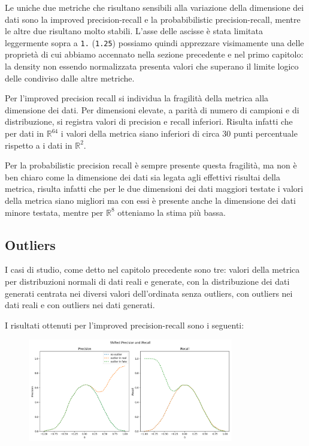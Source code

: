 Le uniche due metriche che risultano sensibili alla variazione della dimensione dei dati sono la improved precision-recall e la probabibilistic precision-recall, mentre le altre due risultano molto stabili.
L'asse delle ascisse è stata limitata leggermente sopra a \texttt{1.} (\texttt{1.25}) possiamo quindi apprezzare visimamente una delle proprietà di cui abbiamo accennato nella sezione precedente e nel primo capitolo:
la density non essendo normalizzata presenta valori che superano il limite logico delle condiviso dalle altre metriche.

Per l'improved precision recall si individua la fragilità della metrica alla dimensione dei dati. Per dimensioni elevate, a parità di numero di campioni e di distribuzione, si registra valori di precision e recall inferiori.
Risulta infatti che per dati in \(\mathbb{R}^{64}\) i valori della metrica siano inferiori di circa 30 punti percentuale rispetto a i dati in  \(\mathbb{R}^{2}\).

Per la probabilistic precision recall è sempre presente questa fragilità, ma non è ben chiaro come la dimensione dei dati sia legata agli effettivi risultai della metrica, risulta infatti che per le due dimensioni dei dati maggiori
testate i valori della metrica siano migliori ma con essi è presente anche la dimensione dei dati minore testata, mentre per \(\mathbb{R}^{8}\) otteniamo la stima più bassa.

\subsection{Outliers}

I casi di studio, come detto nel capitolo precedente sono tre: valori della metrica per distribuzioni normali di dati reali e generate, con la distribuzione dei dati generati centrata nei diversi valori dell'ordinata senza outliers, con outliers nei dati reali e con outliers nei dati generati.

I risultati ottenuti per l'improved precision-recall sono i seguenti:

\clearpage

\begin{figure}[!ht]
    \centering
    \includegraphics[width=0.8\textwidth]{../images/toyexperiments/outliers/shift_iPrecision_iRecall.png} 
\end{figure}

